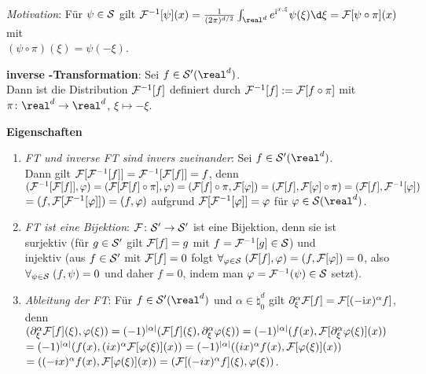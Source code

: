 \linie

\emph{Motivation}:
Für $\psi \in \S$ gilt $\F^{-1}[\psi](x) =
\frac{1}{(2\pi)^{d/2}} \int_{\real^d} e^{\i\sp{x, \xi}}\psi(\xi)\d\xi =
\F[\psi \circ \pi](x)$ mit\\
$(\psi \circ \pi)(\xi) = \psi(-\xi)$.

\textbf{inverse -Transformation}:
Sei $f \in \S'(\real^d)$.\\
Dann ist die Distribution $\F^{-1}[f]$ definiert durch
$\F^{-1}[f] := \F[f \circ \pi]$ mit $\pi\colon \real^d \rightarrow \real^d$,
$\xi \mapsto -\xi$.

\linie

\textbf{Eigenschaften}
\begin{enumerate}
    \item
    \emph{FT und inverse FT sind invers zueinander}:
    Sei $f \in \S'(\real^d)$.\\
    Dann gilt $\F[\F^{-1}[f]] = \F^{-1}[\F[f]] = f$, denn\\
    $(\F^{-1}[\F[f]], \varphi) =
    (\F[\F[f] \circ \pi], \varphi) =
    (\F[f] \circ \pi, \F[\varphi]) =
    (\F[f], \F[\varphi] \circ \pi) =
    (\F[f], \F^{-1}[\varphi])$\\
    $= (f, \F[\F^{-1}[\varphi]]) =
    (f, \varphi)$
    aufgrund $\F[\F^{-1}[\varphi]] = \varphi$ für $\varphi \in \S(\real^d)$.

    \item
    \emph{FT ist eine Bijektion}:
    $\F\colon \S' \rightarrow \S'$ ist eine Bijektion, denn sie ist\\
    surjektiv
    (für $g \in \S'$ gilt $\F[f] = g$ mit $f = \F^{-1}[g] \in \S$) und\\
    injektiv
    (aus $f \in \S'$ mit $\F[f] = 0$ folgt
    $\forall_{\varphi \in \S}\; (\F[f], \varphi) = (f, \F[\varphi]) = 0$,
    also\\
    $\forall_{\psi \in \S}\; (f, \psi) = 0$ und daher $f = 0$,
    indem man $\varphi = \F^{-1}(\psi) \in \S$ setzt).

    \item
    \emph{Ableitung der FT}:
    Für $f \in \S'(\real^d)$ und $\alpha \in \natural_0^d$ gilt
    $\partial_\xi^\alpha \F[f] = \F[(-\i x)^\alpha f]$, denn\\
    $(\partial_\xi^\alpha \F[f](\xi), \varphi(\xi)) =
    (-1)^{|\alpha|} (\F[f](\xi), \partial_\xi^\alpha \varphi(\xi)) =
    (-1)^{|\alpha|} (f(x), \F[\partial_\xi^\alpha \varphi(\xi)](x))$\\
    $= (-1)^{|\alpha|} (f(x), (ix)^\alpha \F[\varphi(\xi)](x)) =
    (-1)^{|\alpha|} ((ix)^\alpha f(x), \F[\varphi(\xi)](x))$\\
    $= ((-ix)^\alpha f(x), \F[\varphi(\xi)](x)) =
    (\F[(-ix)^\alpha f](\xi), \varphi(\xi))$.


\end{enumerate}

